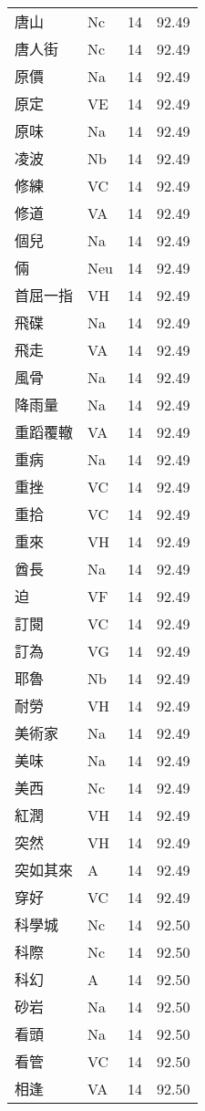 \documentclass[twocolumn]{book}
\begin{document}
\begin{supertabular}{llrr}
唐山 & Nc & 14 &  92.49\\
唐人街 & Nc & 14 &  92.49\\
原價 & Na & 14 &  92.49\\
原定 & VE & 14 &  92.49\\
原味 & Na & 14 &  92.49\\
凌波 & Nb & 14 &  92.49\\
修練 & VC & 14 &  92.49\\
修道 & VA & 14 &  92.49\\
個兒 & Na & 14 &  92.49\\
倆 & Neu & 14 &  92.49\\
首屈一指 & VH & 14 &  92.49\\
飛碟 & Na & 14 &  92.49\\
飛走 & VA & 14 &  92.49\\
風骨 & Na & 14 &  92.49\\
降雨量 & Na & 14 &  92.49\\
重蹈覆轍 & VA & 14 &  92.49\\
重病 & Na & 14 &  92.49\\
重挫 & VC & 14 &  92.49\\
重拾 & VC & 14 &  92.49\\
重來 & VH & 14 &  92.49\\
酋長 & Na & 14 &  92.49\\
迫 & VF & 14 &  92.49\\
訂閱 & VC & 14 &  92.49\\
訂為 & VG & 14 &  92.49\\
耶魯 & Nb & 14 &  92.49\\
耐勞 & VH & 14 &  92.49\\
美術家 & Na & 14 &  92.49\\
美味 & Na & 14 &  92.49\\
美西 & Nc & 14 &  92.49\\
紅潤 & VH & 14 &  92.49\\
突然 & VH & 14 &  92.49\\
突如其來 & A & 14 &  92.49\\
穿好 & VC & 14 &  92.49\\
科學城 & Nc & 14 &  92.50\\
科際 & Nc & 14 &  92.50\\
科幻 & A & 14 &  92.50\\
砂岩 & Na & 14 &  92.50\\
看頭 & Na & 14 &  92.50\\
看管 & VC & 14 &  92.50\\
相逢 & VA & 14 &  92.50\\

\end{supertabular}
\end{document}
